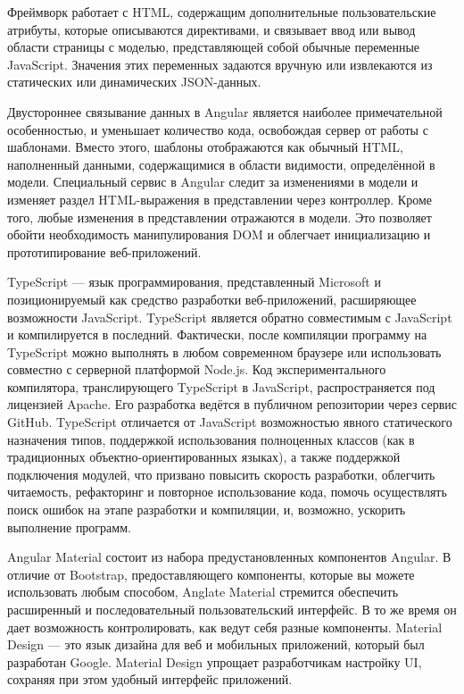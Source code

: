 Фреймворк работает с HTML, содержащим дополнительные пользовательские атрибуты, которые описываются директивами, и связывает ввод или вывод области страницы с моделью, представляющей собой обычные переменные JavaScript.
Значения этих переменных задаются вручную или извлекаются из статических или динамических JSON-данных.

Двустороннее связывание данных в Angular является наиболее примечательной особенностью, и уменьшает количество кода, освобождая сервер от работы с шаблонами.
Вместо этого, шаблоны отображаются как обычный HTML, наполненный данными, содержащимися в области видимости, определённой в модели.
Специальный сервис в Angular следит за изменениями в модели и изменяет раздел HTML-выражения в представлении через контроллер.
Кроме того, любые изменения в представлении отражаются в модели.
Это позволяет обойти необходимость манипулирования DOM и облегчает инициализацию и прототипирование веб-приложений.

TypeScript — язык программирования, представленный Microsoft и позиционируемый как средство разработки веб-приложений, расширяющее возможности JavaScript.
TypeScript является обратно совместимым с JavaScript и компилируется в последний.
Фактически, после компиляции программу на TypeScript можно выполнять в любом современном браузере или использовать совместно с серверной платформой Node.js.
Код экспериментального компилятора, транслирующего TypeScript в JavaScript, распространяется под лицензией Apache.
Его разработка ведётся в публичном репозитории через сервис GitHub.
TypeScript отличается от JavaScript возможностью явного статического назначения типов, поддержкой использования полноценных классов (как в традиционных объектно-ориентированных языках), а также поддержкой подключения модулей, что призвано повысить скорость разработки, облегчить читаемость, рефакторинг и повторное использование кода, помочь осуществлять поиск ошибок на этапе разработки и компиляции, и, возможно, ускорить выполнение программ.

Angular Material состоит из набора предустановленных компонентов Angular.
В отличие от Bootstrap, предоставляющего компоненты, которые вы можете использовать любым способом, Anglate Material стремится обеспечить расширенный и последовательный пользовательский интерфейс.
В то же время он дает возможность контролировать, как ведут себя разные компоненты.
Material Design — это язык дизайна для веб и мобильных приложений, который был разработан Google.
Material Design упрощает разработчикам настройку UI, сохраняя при этом удобный интерфейс приложений.

